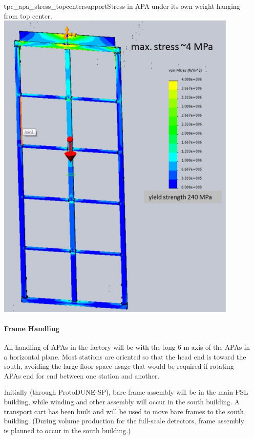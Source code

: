 \begin{cdrfigure}{tpc_apa_stress_topcentersupport}{Stress in APA under its own weight hanging from top center.}
\includegraphics[width=0.9\textwidth]{figures/tpc_apa_stress_topcentersupport.png} 
\end{cdrfigure}

\paragraph{Frame Handling}

All handling of APAs in the factory will be with the long 6-m axis of the APAs in a horizontal plane. Most stations are oriented so that the head end is toward the south, avoiding the large floor space usage that would be required if rotating APAs end for end between one station and another. 

Initially (through ProtoDUNE-SP), bare frame assembly will be in the main PSL building, while winding and other assembly will occur in the south building.  A transport cart has been built and will be used to move bare frames to the south building. (During volume production for the full-scale detectors, frame assembly is planned to occur in the south building.)

